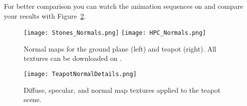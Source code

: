 \documentclass[12pt, a4paper, oneside, ngerman]{article}
\begin{document}
For better comparison you can watch the animation sequences on \Moodle and compare your results with Figure~\ref{fig:normalScene}.

\begin{figure}
  \centering
  \texttt{[image: Stones\_Normals.png]}
  \texttt{[image: HPC\_Normals.png]}
  \caption{Normal maps for the ground plane (left) and teapot (right). All textures can be downloaded on \Moodle.}
  \label{fig:normalTextures}
\end{figure}

\begin{figure}
  \centering
  \texttt{[image: TeapotNormalDetails.png]}
  \caption{Diffuse, specular, and normal map textures applied to the teapot scene.}
  \label{fig:normalScene}
\end{figure}
\end{document}
